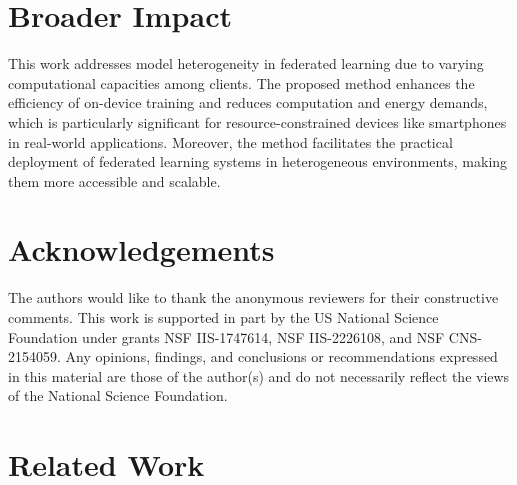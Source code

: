 \documentclass{article}
\theoremstyle{plain}
\theoremstyle{definition}
\theoremstyle{remark}
\begin{document}
\section*{Broader Impact}
This work addresses model heterogeneity in federated learning due to varying computational capacities among clients. The proposed method enhances the efficiency of on-device training and reduces computation and energy demands, which is particularly significant for resource-constrained devices like smartphones in real-world applications. Moreover, the method facilitates the practical deployment of federated learning systems in heterogeneous environments, making them more accessible and scalable.


\section*{Acknowledgements}
The authors would like to thank the anonymous reviewers for their constructive comments. This work is supported in part by the US National Science Foundation under grants NSF IIS-1747614, NSF IIS-2226108, and NSF CNS-2154059. Any opinions, findings, and conclusions or recommendations expressed in this material are those of the author(s) and do not necessarily reflect the views of the National Science Foundation. 




\appendix

\allowdisplaybreaks

\newpage
\section{Related Work} \label{appendix:related_work}
\end{document}
